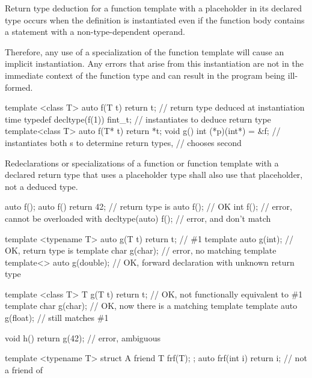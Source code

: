 \pnum
Return type deduction for a function template with a placeholder in its
declared type occurs when the definition is instantiated even if the function
body contains a  statement with a non-type-dependent operand.
\begin{note} Therefore, any use of a specialization of the function template will
cause an implicit instantiation. Any errors that arise from this instantiation
are not in the immediate context of the function type and can result in the
program being ill-formed. \end{note}
\begin{example}
\begin{codeblock}
template <class T> auto f(T t) { return t; }    // return type deduced at instantiation time
typedef decltype(f(1)) fint_t;                  // instantiates  to deduce return type
template<class T> auto f(T* t) { return *t; }
void g() { int (*p)(int*) = &f; }               // instantiates both s to determine return types,
                                                // chooses second
\end{codeblock}
\end{example}

\pnum
Redeclarations or specializations of a function or function template with a
declared return type that uses a placeholder type shall also use that
placeholder, not a deduced type.
\begin{example}
\begin{codeblock}
auto f();
auto f() { return 42; }                         // return type is 
auto f();                                       // OK
int f();                                        // error, cannot be overloaded with 
decltype(auto) f();                             // error,  and  don't match

template <typename T> auto g(T t) { return t; } // \#1
template auto g(int);                           // OK, return type is 
template char g(char);                          // error, no matching template
template<> auto g(double);                      // OK, forward declaration with unknown return type

template <class T> T g(T t) { return t; }       // OK, not functionally equivalent to \#1
template char g(char);                          // OK, now there is a matching template
template auto g(float);                         // still matches \#1

void h() { return g(42); }                      // error, ambiguous

template <typename T> struct A {
  friend T frf(T);
};
auto frf(int i) { return i; }                   // not a friend of 
\end{codeblock}
\end{example}

